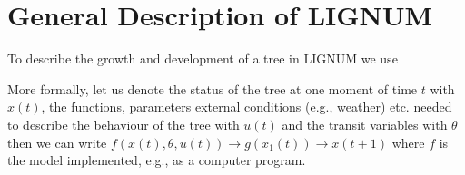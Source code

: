 \chapter{General Description of LIGNUM}

To describe the growth and development of a tree in LIGNUM we use 

More formally, let us  denote the status of  the tree at one moment of
time $ t $ with $ x(t)$, the functions, parameters external conditions
(e.g., weather) etc. needed to describe the behaviour of the tree with
$ u(t) $ and the transit variables with $ \theta $ then we can write $
f(x(t),\theta,  u(t)) \rightarrow   g(x_{1}(t))  \rightarrow x(t+1)  $
where $ f $ is the model implemented, e.g., as a computer program.

